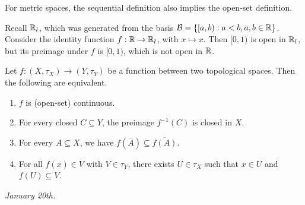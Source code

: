 For metric spaces, the sequential definition also implies the open-set definition.

\begin{example}
    Recall $\mathbb{R}_{l}$, which was generated from the basis $\mathcal{B} = \{[a,b) : a < b, a,b \in \mathbb{R}\}$. Consider the identity function $f : \mathbb{R} \to \mathbb{R}_{l}$, with $x \mapsto x$. Then $[0,1)$ is open in $\mathbb{R}_{l}$, but its preimage under $f$ is $[0,1)$, which is not open in $\mathbb{R}$.  
\end{example}


\begin{theorem}
    Let $f:(X,\tau_{X}) \to (Y,\tau_{Y})$ be a function between two topological spaces. Then the following are equivalent.
    \begin{enumerate}[label=(\roman*)]
        \item $f$ is (open-set) continuous.
        \item For every closed $C \subseteq Y$, the preimage $f^{-1}(C)$ is closed in $X$.
        \item For every $A \subseteq X$, we have $f(\overline{A}) \subseteq \overline{f(A)}$.
        \item For all $f(x) \in V$ with $V \in \tau_{Y}$, there exists $U \in \tau_{X}$ such that $x \in U$ and $f(U) \subseteq V$.
    \end{enumerate}
\end{theorem}

\textit{January 20th.}


